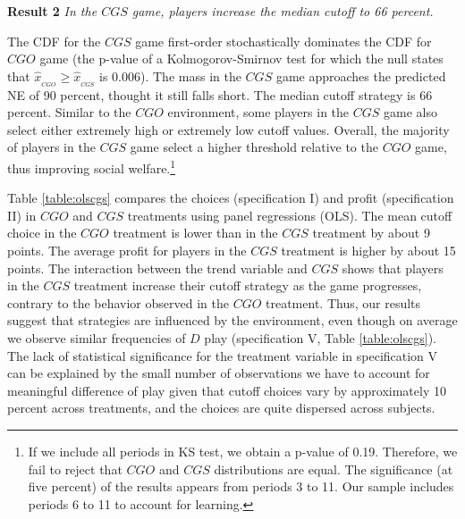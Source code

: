 \documentclass[11pt,english]{article}
\begin{document}
\noindent \textbf{Result 2}
\textit{In the $CGS$ game, players increase the median cutoff to 66 percent.}

The CDF for the $CGS$ game first-order stochastically dominates the CDF for $CGO$ game (the p-value of a Kolmogorov-Smirnov test for which the null states that $\hat{x}_{_{CGO}} \geq \hat{x}_{_{CGS}}$ is 0.006). The mass in the $CGS$ game approaches the predicted NE of 90 percent, thought it still falls short. The median cutoff strategy is 66 percent. Similar to the $CGO$ environment, some players in the $CGS$ game also select either extremely high or extremely low cutoff values. Overall, the majority of players in the $CGS$ game select a higher threshold relative to the $CGO$ game, thus improving social welfare.\footnote{If we include all periods in KS test, we obtain a p-value of 0.19. Therefore, we fail to reject that $CGO$ and $CGS$ distributions are equal. The significance (at five percent) of the results appears from periods 3 to 11. Our sample includes periods 6 to 11 to account for learning.}

Table \ref{table:olscgs} compares the choices (specification I) and profit (specification II) in $CGO$ and $CGS$ treatments using panel regressions (OLS). The mean cutoff choice in the $CGO$ treatment is lower than in the $CGS$ treatment by about 9 points. The average profit for players in the $CGS$ treatment is higher by about 15 points. The interaction between the trend variable and $CGS$ shows that players in the $CGS$ treatment increase their cutoff strategy as the game progresses, contrary to the behavior observed in the $CGO$ treatment. Thus, our results suggest that strategies are influenced by the environment, even though on average we observe similar frequencies of $D$ play (specification V, Table \ref{table:olscgs}). The lack of statistical significance for the treatment variable in specification V can be explained by the small number of observations we have to account for meaningful difference of play given that cutoff choices vary by approximately 10 percent across treatments, and the choices are quite dispersed across subjects.\\ 
\end{document}
